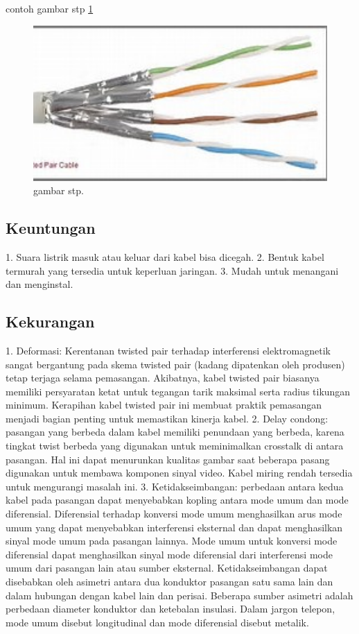 	contoh gambar stp \ref{stp}
	\begin{figure}[ht]
		\centerline{\includegraphics[width=1\textwidth]{figures/stp.jpg}}
		\caption{gambar stp.}
		\label{stp}
	\end{figure}
	
\subsection{Keuntungan}
1. Suara listrik masuk atau keluar dari kabel bisa dicegah.
2. Bentuk kabel termurah yang tersedia untuk keperluan jaringan.
3. Mudah untuk menangani dan menginstal.

\subsection{Kekurangan}
1. Deformasi: Kerentanan twisted pair terhadap interferensi elektromagnetik sangat bergantung pada skema twisted pair (kadang dipatenkan oleh produsen) 
tetap terjaga selama pemasangan. Akibatnya, kabel twisted pair biasanya memiliki persyaratan ketat untuk tegangan tarik maksimal serta radius tikungan 
minimum. Kerapihan kabel twisted pair ini membuat praktik pemasangan menjadi bagian penting untuk memastikan kinerja kabel.
2. Delay condong: pasangan yang berbeda dalam kabel memiliki penundaan yang berbeda, karena tingkat twist berbeda yang digunakan untuk meminimalkan crosstalk 
di antara pasangan. Hal ini dapat menurunkan kualitas gambar saat beberapa pasang digunakan untuk membawa komponen sinyal video. Kabel miring rendah tersedia 
untuk mengurangi masalah ini.
3. Ketidakseimbangan: perbedaan antara kedua kabel pada pasangan dapat menyebabkan kopling antara mode umum dan mode diferensial. Diferensial terhadap konversi
mode umum menghasilkan arus mode umum yang dapat menyebabkan interferensi eksternal dan dapat menghasilkan sinyal mode umum pada pasangan lainnya. Mode umum 
untuk konversi mode diferensial dapat menghasilkan sinyal mode diferensial dari interferensi mode umum dari pasangan lain atau sumber eksternal. 
Ketidakseimbangan dapat disebabkan oleh asimetri antara dua konduktor pasangan satu sama lain dan dalam hubungan dengan kabel lain dan perisai. Beberapa 
sumber asimetri adalah perbedaan diameter konduktor dan ketebalan insulasi. Dalam jargon telepon, mode umum disebut longitudinal dan mode diferensial 
disebut metalik.


